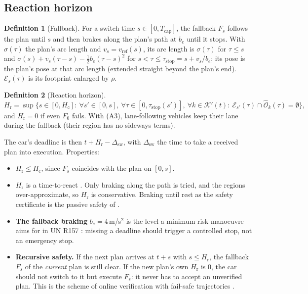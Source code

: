\documentclass[11pt]{article}
\theoremstyle{definition}
\newtheorem{definition}{Definition}
\theoremstyle{remark}
\newcommand{\Ohat}{\widehat{\mathcal{O}}}
\newcommand{\Ego}{\mathcal{E}}
\newcommand{\Hc}{H_{\mathrm{c}}}
\newcommand{\Hr}{H_{\mathrm{r}}}
\newcommand{\Tcap}{T_{\mathrm{cap}}}
\newcommand{\vref}{v_{\mathrm{ref}}}
\begin{document}
\subsection{Reaction horizon}
\begin{definition}[Fallback]
For a switch time $s\in[0,\Tcap]$, the fallback $F_s$ follows the plan until $s$ and then brakes along
the plan's path at $b_e$ until it stops. With $\sigma(\tau)$ the plan's arc length and
$v_s=\vref(s)$, its arc length is $\sigma(\tau)$ for $\tau\le s$ and
$\sigma(s)+v_s(\tau-s)-\tfrac12b_e(\tau-s)^2$ for $s<\tau\le\tau_{\mathrm{stop}}=s+v_s/b_e$; its pose is the
plan's pose at that arc length (extended straight beyond the plan's end). $\Ego_s(\tau)$ is its
footprint enlarged by $\rho$.
\end{definition}

\begin{definition}[Reaction horizon]
\[
\Hr=\sup\Big\{s\in[0,\Hc]:\ \forall s'\in[0,s],\ \forall\tau\in[0,\tau_{\mathrm{stop}}(s')],\ \forall k\in\mathcal K'(t):\ \Ego_{s'}(\tau)\cap\Ohat_k(\tau)=\emptyset\Big\},
\]
and $\Hr=0$ if even $F_0$ fails. With (A3), lane-following vehicles keep their lane during the
fallback (their region has no sideways terms).
\end{definition}

The car's deadline is then $t+\Hr-\Delta_{\mathrm{sw}}$, with $\Delta_{\mathrm{sw}}$ the time to take a
received plan into execution. Properties:
\begin{itemize}[leftmargin=*]
  \item $\Hr\le\Hc$, since $F_s$ coincides with the plan on $[0,s]$.
  \item $\Hr$ is a time-to-react \cite{hillenbrand2006,sontges2018}. Only braking along the path is tried,
    and the regions over-approximate, so $\Hr$ is conservative. Braking until rest as the safety certificate
    is the passive safety of \cite{macek2009}.
  \item \textbf{The fallback braking} $b_e=4$\,m/s$^2$ is the level a minimum-risk manoeuvre aims for in UN R157
    \cite{unr157}: missing a deadline should trigger a controlled stop, not an emergency stop.
  \item \textbf{Recursive safety.} If the next plan arrives at $t+s$ with $s\le\Hr$, the fallback $F_s$ of
    the \emph{current} plan is still clear. If the new plan's own $\Hr$ is 0, the car should not switch to
    it but execute $F_s$: it never has to accept an unverified plan. This is the scheme of online
    verification with fail-safe trajectories \cite{pek2020,pek2021}.
\end{itemize}
\end{document}
